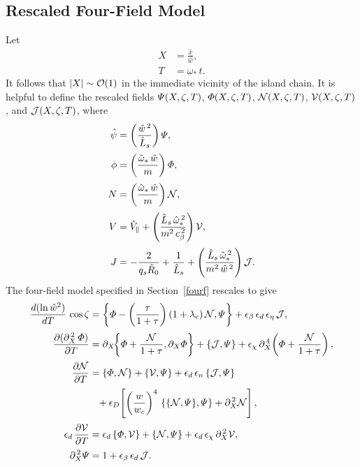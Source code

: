 \documentclass[notitlepage,12pt]{article}
\begin{document}
\subsection{Rescaled Four-Field Model}\label{s8.2}
Let
\begin{align}
X &= \frac{\hat{x}}{\hat{w}},\\[0.5ex]
T &= \omega_\ast\,t.
\end{align}
It follows that $|X|\sim {\cal O}(1)$ in the immediate vicinity of the island chain. It is helpful to define the
rescaled fields ${\mit\Psi}(X,\zeta,T)$, ${\mit\Phi}(X,\zeta,T)$, ${\cal N}(X,\zeta,T)$,
${\cal V}(X,\zeta,T)$, and ${\cal J}(X,\zeta,T)$, where
\begin{align}
\hat{\psi} &= \left(\frac{\hat{w}^{\,2}}{\hat{L}_s}\right){\mit\Psi},\label{e466}\\[0.5ex]
\phi &=\left(\frac{\hat{\omega}_\ast\,\hat{w}}{m}\right){\mit\Phi},\\[0.5ex]
N &= \left(\frac{\hat{\omega}_\ast\,\hat{w}}{m}\right){\cal N},\\[0.5ex]
V&= \hat{V}_\parallel + \left(\frac{\hat{L}_s\,\hat{\omega}_\ast^{\,2}}{m^2\,c_\beta^{\,2}}\right){\cal V},\\[0.5ex]
J & =-\frac{2}{q_s \hat{R}_0} + \frac{1}{\hat{L}_s} + \left(\frac{\hat{L}_s\,\hat{\omega}_\ast^{\,2}}{m^2\,\hat{w}^{\,2}}\right){\cal J}.
\end{align}
The four-field model specified in Section~\ref{fourf} rescales to give
\begin{align}\label{e469}
\frac{d(\ln \hat{w}^2)}{dT}\,\cos\zeta &= \left\{{\mit\Phi}-\left(\frac{\tau}{1+\tau}\right)(1+\lambda_e)\,{\cal N}, {\mit\Psi}\right\}
+ \epsilon_\beta\,\epsilon_d\,\epsilon_\eta\,{\cal J},\\[0.5ex]
\frac{\partial(\partial_X^{\,2}\,{\mit\Phi})}{\partial T} &= \partial_X\!\!\left\{{\mit\Phi} + \frac{{\cal N}}{1+\tau},\partial_X{\mit\Phi}\right\}
+ \{{\cal J},{\mit\Psi}\}+ \epsilon_\chi \,\partial_X^{\,4}\!\left({\mit\Phi} + \frac{{\cal N}}{1+\tau}\right),\label{e470}\\[0.5ex]
\frac{\partial {\cal N}}{\partial T} &= \{{\mit\Phi}, {\cal N}\} + \{{\cal V},{\mit\Psi}\} + \epsilon_d\,\epsilon_n\,\{{\cal J},{\mit\Psi}\}\nonumber\\[0.5ex]&\phantom{=}
+ \epsilon_D \!\left[\left(\frac{w}{w_c}\right)^4\,\{\{{\cal N},{\mit\Psi}\}, {\mit\Psi}\}+\partial_X^{\,2}{\cal N}\right],\label{e471}\\[0.5ex]
\epsilon_d\,\frac{\partial {\cal V}}{\partial T} &= \epsilon_d\,\{{\mit\Phi},{\cal V}\}+\{{\cal N}, {\mit\Psi}\} + \epsilon_d\,\epsilon_\chi\,\partial_X^{\,2} {\cal V},\label{e472}\\[0.5ex]
\partial_X^{\,2}{\mit\Psi} &= 1+ \epsilon_\beta\,\epsilon_d\,{\cal J}.\label{e473}
\end{align}
\end{document}
